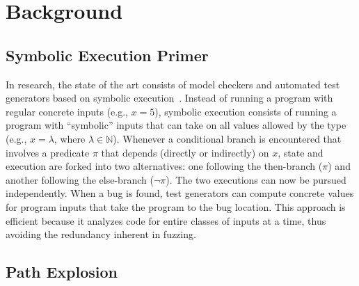 
\section{Background}



\subsection{Symbolic Execution Primer}

In research, the state of the art consists of model checkers and automated test generators based on symbolic execution~\cite{dart,klee}.  Instead of running a program with regular concrete inputs (e.g., $x\!=\!5$), symbolic execution consists of running a program with ``symbolic'' inputs that can take on all values allowed by the type (e.g., $x\!=\!\lambda$, where $\lambda \in \mathbb{N}$).  Whenever a conditional branch is encountered that involves a predicate $\pi$ that depends (directly or indirectly) on $x$, state and execution are forked into two alternatives: one following the then-branch ($\pi$) and another following the else-branch ($\neg \pi$). The two executions can now be pursued independently.  When a bug is found, test generators can compute concrete values for program inputs that take the program to the bug location.  This approach is efficient because it analyzes code for entire classes of inputs at a time, thus avoiding the redundancy inherent in fuzzing.

\subsection{Path Explosion}

